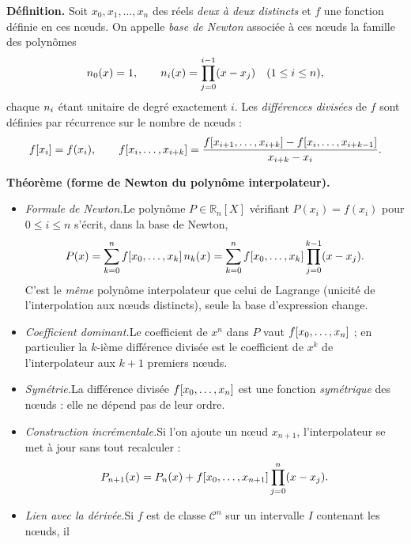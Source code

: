\begin{tcolorbox}[thmbox]
  \textbf{Définition.}\enspace{}%
  Soit $x_0, x_1, \ldots, x_n$ des réels \emph{deux à deux distincts} et $f$
  une fonction définie en ces nœuds. On appelle \emph{base de Newton}
  associée à ces nœuds la famille des polynômes
  \[
    n_{0}(x) = 1, \qquad
    n_{i}(x) = \prod_{j=0}^{i-1}(x-x_j) \quad (1 \leq i \leq n),
  \]
  chaque $n_{i}$ étant unitaire de degré exactement $i$. Les
  \emph{différences divisées} de $f$ sont définies par récurrence sur le
  nombre de nœuds :
  \[
    f[x_i] = f(x_i), \qquad
    f[x_i,\ldots,x_{i+k}]
    = \dfrac{f[x_{i+1},\ldots,x_{i+k}] - f[x_i,\ldots,x_{i+k-1}]}
            {x_{i+k}-x_i}.
  \]

  \medskip
  \textbf{Théorème (forme de Newton du polynôme interpolateur).}
  \begin{itemize}
    \item \textit{Formule de Newton.}\enspace Le polynôme $P \in
          \mathbb{R}_n[X]$ vérifiant $P(x_i)=f(x_i)$ pour $0\leq i\leq n$
          s'écrit, dans la base de Newton,
          \[
            P(x) = \sum_{k=0}^{n} f[x_0,\ldots,x_k]\,n_{k}(x)
                 = \sum_{k=0}^{n} f[x_0,\ldots,x_k]\prod_{j=0}^{k-1}(x-x_j).
          \]
          C'est le \emph{même} polynôme interpolateur que celui de Lagrange
          (unicité de l'interpolation aux nœuds distincts), seule la base
          d'expression change.
    \item \textit{Coefficient dominant.}\enspace Le coefficient de $x^n$
          dans $P$ vaut $f[x_0,\ldots,x_n]$ ; en particulier la $k$-ième
          différence divisée est le coefficient de $x^k$ de l'interpolateur
          aux $k+1$ premiers nœuds.
    \item \textit{Symétrie.}\enspace La différence divisée
          $f[x_0,\ldots,x_n]$ est une fonction \emph{symétrique} des
          nœuds : elle ne dépend pas de leur ordre.
    \item \textit{Construction incrémentale.}\enspace Si l'on ajoute un
          nœud $x_{n+1}$, l'interpolateur se met à jour sans tout
          recalculer :
          \[
            P_{n+1}(x) = P_n(x)
              + f[x_0,\ldots,x_{n+1}]\prod_{j=0}^{n}(x-x_j).
          \]
    \item \textit{Lien avec la dérivée.}\enspace Si $f$ est de classe
          $\mathcal{C}^n$ sur un intervalle $I$ contenant les nœuds, il

\end{itemize}
\end{tcolorbox}
